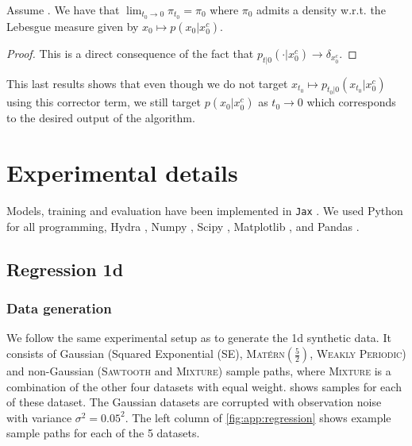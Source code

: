 \begin{proposition}
	Assume \textup{}.
	We have that $\lim_{t_0 \to 0} \pi_{t_0} = \pi_0$ where $\pi_0$ admits a density w.r.t.
	the Lebesgue measure given by $x_0 \mapsto p(x_0|x_0^c)$.
\end{proposition}

\begin{proof}
	This is a direct consequence of the fact that $p_{t|0}(\cdot|x_0^c) \to \delta_{x_0^c}$.
\end{proof}

This last results shows that even though we do not target $x_{t_0} \mapsto p_{t_0|0}(x_{t_0} |x_0^c)$ using this corrector term, we still target $p(x_0 | x_0^c)$ as $t_0 \to 0$ which corresponds to the desired output of the algorithm.

\section{Experimental details}
\label{app:experimental_details}

Models, training and evaluation have been implemented in \texttt{Jax} \parencite{jax2018github}.
We used Python \parencite{van1995python} for all programming, Hydra \parencite{Yadan2019Hydra}, Numpy \parencite{harris2020}, Scipy \parencite{2020SciPy-NMeth}, Matplotlib \parencite{Hunter2007}, and Pandas \parencite{mckinney2010data}.

\subsection{Regression 1d}
\label{app:experimental_details_1d_regression}

\subsubsection{Data generation}

We follow the same experimental setup as \textcite{bruinsma2020Gaussian} to generate the 1d synthetic data.
It consists of Gaussian (Squared Exponential ({\scshape SE}), {\scshape Mat\'ern$(\tfrac52)$}, {\scshape Weakly Periodic}) and non-Gaussian ({\scshape Sawtooth} and {\scshape Mixture}) sample paths, where {\scshape Mixture} is a combination of the other four datasets with equal weight.
 shows samples for each of these dataset.
The Gaussian datasets are corrupted with observation noise with variance $\sigma^2=0.05^2$.
The left column of \cref{fig:app:regression} shows example sample paths for each of the 5 datasets.

